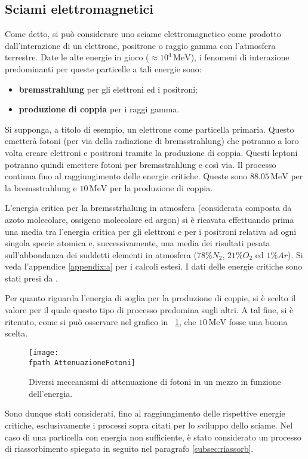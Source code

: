 \documentclass[10pt,a4paper,usenatbib]{article}
\newcommand*{\unit}[1]{\ensuremath{\mathrm{\,#1}}}                              %
\newcommand{\fpath}{./Figs/}
\begin{document}
\subsection{Sciami elettromagnetici}
Come detto, si può considerare uno sciame elettromagnetico come prodotto dall'interazione di un elettrone, positrone o raggio gamma con l'atmosfera terrestre. Date le alte energie in gioco ($\approx10^4\unit{MeV}$), i fenomeni di interazione predominanti per queste particelle a tali energie sono:
\begin{itemize}
\item \textbf{bremsstrahlung} per gli elettroni ed i positroni;
\item \textbf{produzione di coppia} per i raggi gamma.
\end{itemize}
Si supponga, a titolo di esempio, un elettrone come particella primaria. Questo emetterà fotoni (per via della radiazione di bremsstrahlung) che potranno a loro volta creare elettroni e positroni tramite la produzione di coppia. Questi leptoni potranno quindi emettere fotoni per bremsstrahlung e così via. Il processo continua fino al raggiungimento delle energie critiche. Queste sono $88.05\unit{MeV}$ per la bremsstrahlung e $10\unit{MeV}$ per la produzione di coppia. 

L'energia critica per la bremsstrhalung in atmosfera (considerata composta da azoto molecolare, ossigeno molecolare ed argon) si è ricavata effettuando prima una media tra l'energia critica per gli elettroni e per i positroni relativa ad ogni singola specie atomica e, successivamente, una media dei risultati pesata sull'abbondanza dei suddetti elementi in atmosfera ($78\% N_2$, $21\% O_2$ ed $1\% Ar$). Si veda l'appendice \ref{appendix:a} per i calcoli estesi. I dati delle energie critiche sono stati presi da \cite{Olive:2016xmw}. 

Per quanto riguarda l'energia di soglia per la produzione di coppie, si è scelto il valore per il quale questo tipo di processo predomina sugli altri. A tal fine, si è ritenuto, come si può osservare nel grafico in \figurename~\ref{\fpath jpg:AttenuazioneFotoni}, che $10\unit{MeV}$ fosse una buona scelta. 
\begin{figure} [!htb]
\centering
\texttt{[image: \\fpath AttenuazioneFotoni]}
\caption{Diversi meccanismi di attenuazione di fotoni in un mezzo in funzione dell'energia. }
\label{\fpath jpg:AttenuazioneFotoni}
\end{figure}

Sono dunque stati considerati, fino al raggiungimento delle rispettive energie critiche, esclusivamente i processi sopra citati per lo sviluppo dello sciame. Nel caso di una particella con energia non sufficiente, è stato considerato un processo di riassorbimento spiegato in seguito nel paragrafo \ref{subsec:riassorb}. 
\end{document}

